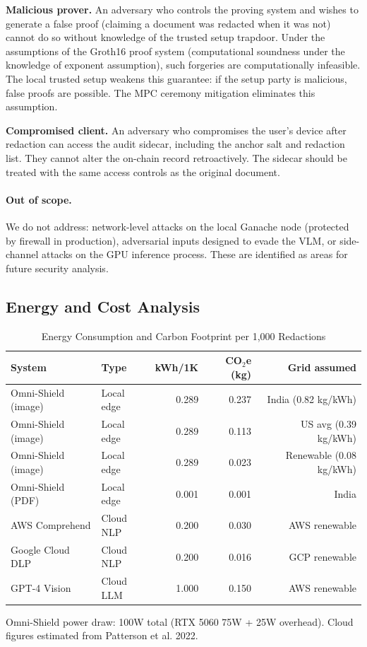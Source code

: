 \documentclass[conference]{IEEEtran}
\begin{document}
\textbf{Malicious prover.}
An adversary who controls the proving system
and wishes to generate a false proof (claiming a
document was redacted when it was not) cannot do
so without knowledge of the trusted setup trapdoor.
Under the assumptions of the Groth16 proof system
(computational soundness under the knowledge
of exponent assumption), such forgeries are
computationally infeasible.
The local trusted setup weakens this guarantee:
if the setup party is malicious, false proofs
are possible.
The MPC ceremony mitigation eliminates this
assumption.

\textbf{Compromised client.}
An adversary who compromises the user's device
after redaction can access the audit sidecar,
including the anchor salt and redaction list.
They cannot alter the on-chain record retroactively.
The sidecar should be treated with the same access
controls as the original document.

\paragraph{Out of scope.}
We do not address: network-level attacks on the
local Ganache node (protected by firewall in
production), adversarial inputs designed to evade
the VLM, or side-channel attacks on the GPU
inference process.
These are identified as areas for future security
analysis.

\subsection{Energy and Cost Analysis}

\begin{table}[h]\centering
\caption{Energy Consumption and Carbon Footprint per 1,000 Redactions}
\label{tab:energy}
\begin{tabular}{llrrr}
\toprule
System & Type & kWh/1K & CO$_2$e (kg) & Grid assumed \\
\midrule
Omni-Shield (image) & Local edge  & 0.289 & 0.237 & India (0.82 kg/kWh) \\
Omni-Shield (image) & Local edge  & 0.289 & 0.113 & US avg (0.39 kg/kWh) \\
Omni-Shield (image) & Local edge  & 0.289 & 0.023 & Renewable (0.08 kg/kWh) \\
Omni-Shield (PDF)   & Local edge  & 0.001 & 0.001 & India \\
AWS Comprehend      & Cloud NLP   & 0.200 & 0.030 & AWS renewable \\
Google Cloud DLP    & Cloud NLP   & 0.200 & 0.016 & GCP renewable \\
GPT-4 Vision        & Cloud LLM   & 1.000 & 0.150 & AWS renewable \\
\bottomrule
\end{tabular}
\footnotesize{Omni-Shield power draw: 100W total (RTX 5060 75W + 25W overhead).
Cloud figures estimated from Patterson et al. 2022.}
\end{table}
\end{document}

